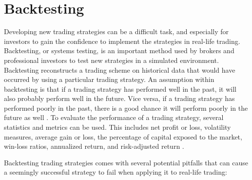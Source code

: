 \section{Backtesting}
Developing new trading strategies can be a difficult task, and especially for investors to gain the confidence to implement the strategies in real-life trading. Backtesting, or systems testing, is an important method used by brokers and professional investors to test new strategies in a simulated environment. Backtesting reconstructs a trading scheme on historical data that would have occurred by using a particular trading strategy. An assumption within backtesting is that if a trading strategy has performed well in the past, it will also probably perform well in the future. Vice versa, if a trading strategy has performed poorly in the past, there is a good chance it will perform poorly in the future as well \cite{ni}.  To evaluate the performance of a trading strategy, several statistics and metrics can be used. This includes net profit or loss, volatility measures, average gain or loss, the percentage of capital exposed to the market, win-loss ratios, annualized return, and risk-adjusted return \cite{kuepper}. 

\indent\newline
Backtesting trading strategies comes with several potential pitfalls that can cause a seemingly successful strategy to fail when applying it to real-life trading: 

